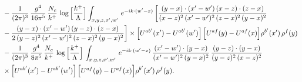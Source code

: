 \documentclass[9pt]{article}
\numberwithin{equation}{section}
\begin{document}
\begin{align}
&-\frac{1}{(2\pi)^{3}}\,\frac{g^{4}}{16\pi^{5}}\,\frac{N_{c}}{k^{+}}\,\log\Big[\frac{k^{+}}{\Lambda}\Big]\int_{x,y,z,x',w'}\,e^{-ik\cdot(w'-x)}\,\bigg[\frac{(y-x)\cdot (x'-w')\,(x-z)\cdot (z-x)}{(x-z)^{2}\,(x'-w')^{2}\,(z-x)^{2}\,(y-x)^{2}}\notag \\ & -\frac{(y-x)\cdot (x'-w')\,(y-z)\cdot (z-x)}{2\,(y-z)^{2}\,(x'-w')^{2}\,(z-x)^{2}\,(y-x)^{2}}\bigg]\times\Big[U^{ab'}(x')-U^{ab'}(w')\Big]\,\Big[U^{af}(y)-U^{af}(x)\Big]\rho^{b'}(x')\,\rho^{f}(y)\notag\\
&-\frac{1}{(2\pi)^{3}}\,\frac{g^{4}}{8\pi^{5}}\,\frac{N_{c}}{k^{+}}\,\log\Big[\frac{k^{+}}{\Lambda}\Big]\,\int_{x,y,z,x',w'}\,e^{-ik\cdot(w'-x)}\,\frac{(x'-w')\cdot(y-x)}{(x'-w')^{2}\,(y-x)^{2}}\,\frac{(y-z)\cdot(y-x)}{(y-z)^{2}\,(x-z)^{2}}\notag\\
&\times\Big[U^{ab'}(x')-U^{ab'}(w')\Big]\,\Big[U^{af}(y)-U^{af}(x)\Big]\rho^{b'}(x')\,\rho^{f}(y).
\end{align}
\end{document}
